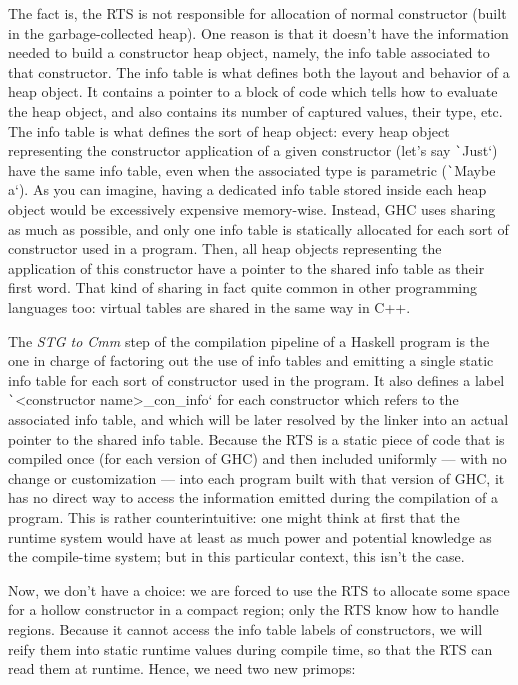 \documentclass[english]{jflart}
\begin{document}
The fact is, the RTS is not responsible for allocation of normal constructor (built in the garbage-collected heap). One reason is that it doesn't have the information needed to build a constructor heap object, namely, the info table associated to that constructor. The info table is what defines both the layout and behavior of a heap object. It contains a pointer to a block of code which tells how to evaluate the heap object, and also contains its number of captured values, their type, etc. The info table is what defines the sort of heap object: every heap object representing the constructor application of a given constructor (let's say \texttt`Just`) have the same info table, even when the associated type is parametric (\texttt`Maybe a`). As you can imagine, having a dedicated info table stored inside each heap object would be excessively expensive memory-wise. Instead, GHC uses sharing as much as possible, and only one info table is statically allocated for each sort of constructor used in a program. Then, all heap objects representing the application of this constructor have a pointer to the shared info table as their first word. That kind of sharing in fact quite common in other programming languages too: virtual tables are shared in the same way in C++.

The \emph{STG to Cmm} step of the compilation pipeline of a Haskell program is the one in charge of factoring out the use of info tables and emitting a single static info table for each sort of constructor used in the program. It also defines a label \texttt`<constructor name>_con_info` for each constructor which refers to the associated info table, and which will be later resolved by the linker into an actual pointer to the shared info table. Because the RTS is a static piece of code that is compiled once (for each version of GHC) and then included uniformly --- with no change or customization --- into each program built with that version of GHC, it has no direct way to access the information emitted during the compilation of a program. This is rather counterintuitive: one might think at first that the runtime system would have at least as much power and potential knowledge as the compile-time system; but in this particular context, this isn't the case.

Now, we don't have a choice: we are forced to use the RTS to allocate some space for a hollow constructor in a compact region; only the RTS know how to handle regions. Because it cannot access the info table labels of constructors, we will reify them into static runtime values during compile time, so that the RTS can read them at runtime. Hence, we need two new primops:
\end{document}
